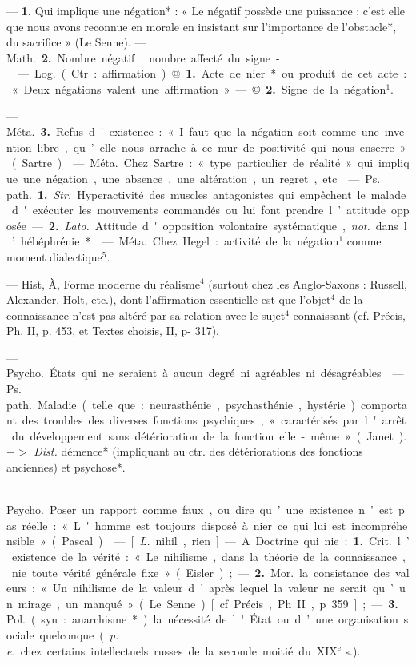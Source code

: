 \begin{itemize}[leftmargin=1cm, label=, itemsep=1pt]
 — {\bf 1.} Qui implique une négation* : « Le négatif possède une
puissance ; c’est elle que nous avons
reconnue en morale en insistant
sur l'importance de l’obstacle*, du
sacrifice » (Le Senne). — \si{Math.} {\bf 2.}
Nombre négatif : nombre affecté du
signe -.

 — \si{Log.} (Ctr. : affirmation).
@. {\bf 1.} Acte de nier* ou produit de
cet acte : « Deux négations valent
une affirmation » — ©. {\bf 2.} Signe
de la négation$^1$.

— \si{Méta.} {\bf 3.} Refus d'existence :
« I faut que la négation soit comme
une invention libre, qu’elle nous
arrache à ce mur de positivité qui
nous enserre » (Sartre).

 — \si{Méta.} Chez Sartre : « type
particulier de réalité » qui implique
une négation, une absence, une
altération, un regret, etc.

 — \si{Ps. path.} {\bf 1.} {\it Str.}
Hyperactivité des muscles antagonistes qui empêchent le malade
d'exécuter les mouvements commandés ou lui font prendre l’attitude opposée. — {\bf 2.} {\it Lato.} Attitude
d'opposition volontaire systématique, {\it not.} dans l’hébéphrénie*.

 — \si{Méta.} Chez Hegel : activité de la négation$^1$ comme moment
dialectique$^5$.

 — Hist, À, Forme moderne du réalisme$^4$ (surtout chez les
Anglo-Saxons : Russell, Alexander,
Holt, etc.), dont l'affirmation essentielle est que l'objet$^4$ de la connaissance n’est pas altéré par sa relation
avec le sujet$^4$ connaissant (cf. Précis,
Ph. II, p. 453, et Textes choisis, II,
p- 317).

 — \si{Psycho.} États qui
ne seraient à aucun degré ni agréables ni désagréables.

 — \si{Ps. path.} Maladie (telle
que : neurasthénie, psychasthénie,
hystérie) comportant des troubles
des diverses fonctions psychiques,
« caractérisés par l'arrêt du développement sans détérioration de la
fonction elle-même » (Janet). $->$
{\it Dist.} démence* (impliquant au ctr.
des détériorations des fonctions anciennes) et psychose*.

 — \si{Psycho.} Poser un rapport
comme faux, ou dire qu’une existence n’est pas réelle : « L'homme
est toujours disposé à nier ce qui lui
est incompréhensible » (Pascal).

 — [{\it L.} nihil, rien] — A. Doctrine qui nie : {\bf 1.} \si{Crit.} l’existence de
la vérité : « Le nihilisme, dans la
théorie de la connaissance, nie toute
vérité générale fixe » (Eisler) ; —
 {\bf 2.} \si{Mor.} la consistance des valeurs :
« ... Un nihilisme de la valeur d’après
lequel la valeur ne serait qu’un
mirage, un manqué » (Le Senne)
[cf. Précis, Ph. II, p. 359] ; — {\bf 3.} \si{Pol.}
(syn. : anarchisme*) la nécessité de
l'État ou d’une organisation sociale
quelconque ({\it p. e.} chez certains intellectuels russes de la seconde moitié
du {\footnotesize XIX}$^\text{e}$ s.).


\end{itemize}
